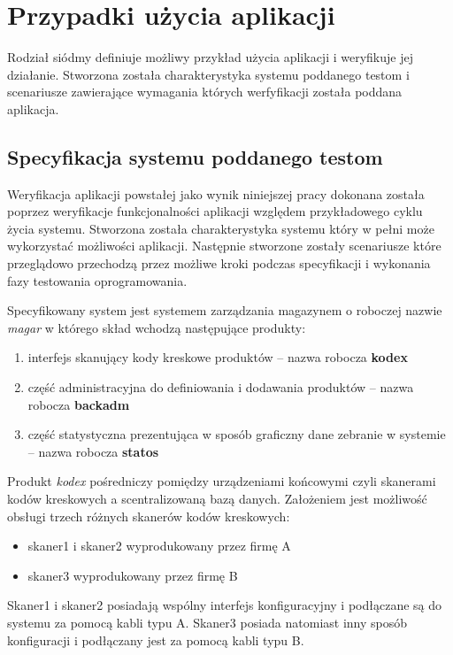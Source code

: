 \chapter{Przypadki użycia aplikacji}
Rodział siódmy definiuje możliwy przykład użycia aplikacji i weryfikuje jej działanie. Stworzona została charakterystyka systemu poddanego testom i scenariusze zawierające wymagania których werfyfikacji została poddana aplikacja.

\section{Specyfikacja systemu poddanego testom}

Weryfikacja aplikacji powstałej jako wynik niniejszej pracy dokonana została poprzez weryfikacje funkcjonalności aplikacji względem przykładowego cyklu życia systemu. Stworzona została charakterystyka systemu który w pełni może wykorzystać możliwości aplikacji. Następnie stworzone zostały scenariusze które przeglądowo przechodzą przez możliwe kroki podczas specyfikacji i wykonania fazy testowania oprogramowania.

Specyfikowany system jest systemem zarządzania magazynem o roboczej nazwie \textit{magar} w którego skład wchodzą następujące produkty:
\begin{enumerate}
  \item interfejs skanujący kody kreskowe produktów -- nazwa robocza \textbf{kodex}
  \item część administracyjna do definiowania i dodawania produktów -- nazwa robocza \textbf{backadm}
  \item część statystyczna prezentująca w sposób graficzny dane zebranie w systemie -- nazwa robocza \textbf{statos}
\end{enumerate}

Produkt \textit{kodex} pośredniczy pomiędzy urządzeniami końcowymi czyli skanerami kodów kreskowych a scentralizowaną bazą danych. Założeniem jest możliwość obsługi trzech różnych skanerów kodów kreskowych:
\begin{itemize}
  \item skaner1 i skaner2 wyprodukowany przez firmę A
  \item skaner3 wyprodukowany przez firmę B
\end{itemize}
Skaner1 i skaner2 posiadają wspólny interfejs konfiguracyjny i podłączane są do systemu za pomocą kabli typu A. Skaner3 posiada natomiast inny sposób konfiguracji i podłączany jest za pomocą kabli typu B.

